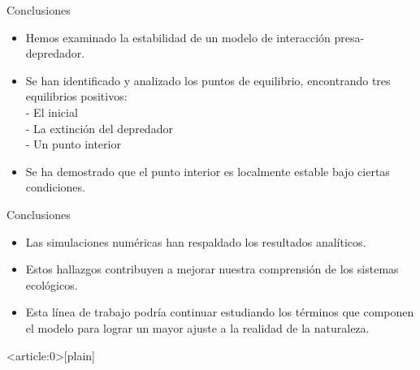 \documentclass{beamer}
\begin{document}
\begin{frame}
    {Conclusiones}
    \begin{itemize}[<+->]

        \item Hemos examinado la estabilidad de un modelo de interacción presa-depredador.

        \item Se han identificado y analizado los puntos de equilibrio,
              encontrando tres equilibrios positivos:\\
              - El inicial\\
              - La extinción del depredador\\
              - Un punto interior
        \item Se ha demostrado que el punto interior es localmente estable bajo ciertas condiciones.
    \end{itemize}
\end{frame}
\begin{frame}
    {Conclusiones}
    \begin{itemize}[<+->]

        \item Las simulaciones numéricas han respaldado los resultados analíticos.

        \item Estos hallazgos contribuyen a mejorar nuestra comprensión de los sistemas ecológicos.

        \item Esta línea de trabajo podría continuar estudiando los términos que componen el modelo para lograr un mayor ajuste a la realidad de la
              naturaleza.
    \end{itemize}
\end{frame}

{ %
\setbeamertemplate{}{}
\begin{frame}<article:0>[plain]
     \end{frame}
}
\end{document}

